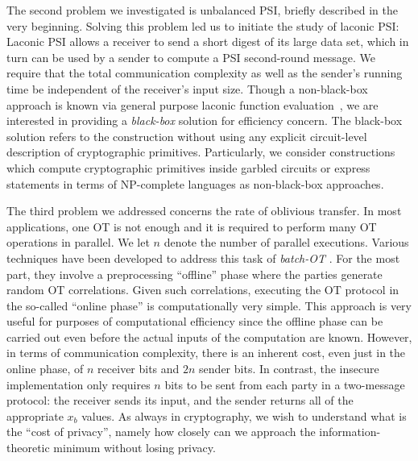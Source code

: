 The second problem we investigated is unbalanced PSI, briefly described in the very beginning. Solving this problem led us to initiate the study of laconic PSI: Laconic PSI allows a receiver to send a short digest of its large data set, which in turn can be used by a sender to compute a PSI second-round message. We require  that the total communication complexity as well as the sender's running time be independent of the receiver's input size. Though a non-black-box approach is known via general purpose laconic function evaluation~\cite{FOCS:QuaWeeWic18}, we are interested in providing a \emph{black-box} solution for efficiency concern.
The black-box solution refers to the construction without using any explicit circuit-level description of cryptographic primitives. Particularly, we consider constructions which compute cryptographic primitives inside garbled circuits or express statements in terms of NP-complete languages as non-black-box approaches. 

The third problem we addressed concerns the rate of oblivious transfer.  In most applications, one OT is not enough and it is required to perform many OT operations in parallel.
We let $n$ denote the number of parallel executions. Various techniques have been developed to address this task of \emph{batch-OT} \cite{C:IKNP03,C:BCGIKS19,CCS:BCGIKRS19}. For the most part, they involve a preprocessing ``offline'' phase where the parties generate random OT correlations. Given such correlations, executing the OT protocol in the so-called ``online phase'' is computationally very simple. This approach is very useful for purposes of computational efficiency since the offline phase can be carried out even before the actual inputs of the computation are known. However, in terms of communication complexity, there is an inherent cost, even just in the online phase, of $n$ receiver bits and $2n$ sender bits. In contrast, the insecure implementation only requires $n$ bits to be sent from each party in a two-message protocol: the receiver sends its input, and the sender returns all of the appropriate $x_b$ values. As always in cryptography, we wish to understand what is the ``cost of privacy'', namely how closely can we approach the information-theoretic minimum without losing privacy. 

